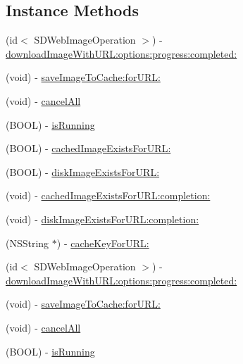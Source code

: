 \subsection*{Instance Methods}
\begin{DoxyCompactItemize}
\item 
(id$<$ S\+D\+Web\+Image\+Operation $>$) -\/ \mbox{\hyperlink{interface_s_d_web_image_manager_ab094c361edd5ff886cbf484892e688be}{download\+Image\+With\+U\+R\+L\+:options\+:progress\+:completed\+:}}
\item 
(void) -\/ \mbox{\hyperlink{interface_s_d_web_image_manager_acd286f805e3334824648122fd213937e}{save\+Image\+To\+Cache\+:for\+U\+R\+L\+:}}
\item 
(void) -\/ \mbox{\hyperlink{interface_s_d_web_image_manager_a8cd0959562d0120f6a1976b8f9d49b7b}{cancel\+All}}
\item 
(B\+O\+OL) -\/ \mbox{\hyperlink{interface_s_d_web_image_manager_afc97641bfb1b30b1a262462a12c56c46}{is\+Running}}
\item 
(B\+O\+OL) -\/ \mbox{\hyperlink{interface_s_d_web_image_manager_a9634c36e65314e0b973056a96f6a62e2}{cached\+Image\+Exists\+For\+U\+R\+L\+:}}
\item 
(B\+O\+OL) -\/ \mbox{\hyperlink{interface_s_d_web_image_manager_a7ed53c304da787466f777c636447e6d0}{disk\+Image\+Exists\+For\+U\+R\+L\+:}}
\item 
(void) -\/ \mbox{\hyperlink{interface_s_d_web_image_manager_a5583bb0fba17b92ce2fe9245b6ecafd2}{cached\+Image\+Exists\+For\+U\+R\+L\+:completion\+:}}
\item 
(void) -\/ \mbox{\hyperlink{interface_s_d_web_image_manager_a05c93459fc0727ca8e7139cfc9d9750c}{disk\+Image\+Exists\+For\+U\+R\+L\+:completion\+:}}
\item 
(N\+S\+String $\ast$) -\/ \mbox{\hyperlink{interface_s_d_web_image_manager_a6f02c3f166329cdc53553621a7f8c04a}{cache\+Key\+For\+U\+R\+L\+:}}
\item 
(id$<$ S\+D\+Web\+Image\+Operation $>$) -\/ \mbox{\hyperlink{interface_s_d_web_image_manager_a975d3dc781fe58ad92f6a40d06c98f35}{download\+Image\+With\+U\+R\+L\+:options\+:progress\+:completed\+:}}
\item 
(void) -\/ \mbox{\hyperlink{interface_s_d_web_image_manager_acd286f805e3334824648122fd213937e}{save\+Image\+To\+Cache\+:for\+U\+R\+L\+:}}
\item 
(void) -\/ \mbox{\hyperlink{interface_s_d_web_image_manager_a8cd0959562d0120f6a1976b8f9d49b7b}{cancel\+All}}
\item 
(B\+O\+OL) -\/ \mbox{\hyperlink{interface_s_d_web_image_manager_afc97641bfb1b30b1a262462a12c56c46}{is\+Running}}

\end{DoxyCompactItemize}
